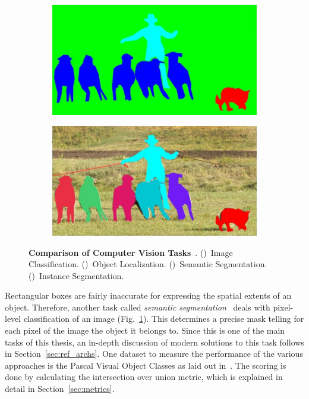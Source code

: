 \begin{figure}[h]
    \begin{subfigure}{\VisionTasksImageWidth}
        \includegraphics[width=\textwidth]{images/vision_task_3}
        \caption{}
        \label{fig:cv_task_semseg}
    \end{subfigure}
    \hspace{5mm}
    \begin{subfigure}{\VisionTasksImageWidth}
        \includegraphics[width=\textwidth]{images/vision_task_4}
        \caption{}
        \label{fig:cv_task_inseg}
    \end{subfigure}

    \caption[Comparison of Computer Vision Tasks]
    {\textbf{Comparison of Computer Vision Tasks}~\cite{coco14}.
    ()~Image Classification.
    ()~Object Localization.
    ()~Semantic Segmentation.
    ()~Instance Segmentation.}
    \label{fig:cv_tasks}
\end{figure}

Rectangular boxes are fairly inaccurate for expressing the spatial extents of an object. Therefore, another task called \emph{semantic segmentation}~\cite{weakseg15} deals with pixel-level classification of an image (Fig.~\ref{fig:cv_task_semseg}). This determines a precise mask telling for each pixel of the image the object it belongs to. Since this is one of the main tasks of this thesis, an in-depth discussion of modern solutions to this task follows in Section~\ref{sec:ref_archs}. One dataset to measure the performance of the various approaches is the Pascal Visual Object Classes as laid out in~\cite{pascal_voc15}. The scoring is done by calculating the intersection over union metric, which is explained in detail in Section~\ref{sec:metrics}.

